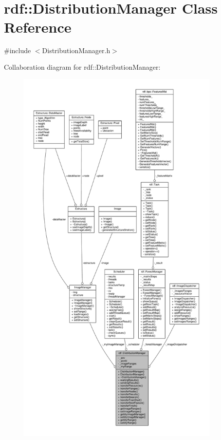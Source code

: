 \hypertarget{classrdf_1_1DistributionManager}{}\section{rdf\+:\+:Distribution\+Manager Class Reference}
\label{classrdf_1_1DistributionManager}


{\ttfamily \#include $<$Distribution\+Manager.\+h$>$}



Collaboration diagram for rdf\+:\+:Distribution\+Manager\+:
\nopagebreak
\begin{figure}[H]
\begin{center}
\leavevmode
\includegraphics[height=550pt]{classrdf_1_1DistributionManager__coll__graph}
\end{center}
\end{figure}
